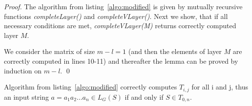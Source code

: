 \begin{proof}

The algorithm from listing~\ref{algo:modified} is given by mutually recursive functions \textit{completeLayer()} and \textit{completeVLayer()}. Next we show, that if all necessary conditions are met, \textit{completeVLayer(M)} returns correctly computed layer $M$.

We consider the matrix of size $m - l = 1$ (and then the elements of layer $M$ are correctly computed in lines 10-11) and thereafter the lemma can be proved by induction on $m - l$. \qed


\end{proof}

\begin{theorem}
Algorithm from listing~\ref{algo:modified} correctly computes $T_{i, j}$ for all i and j, thus an input string $a = a_{1}a_{2} \dots a_{n} \in L_{G}(S)$ if and only if $S \in T_{0, n}$.
\end{theorem}


